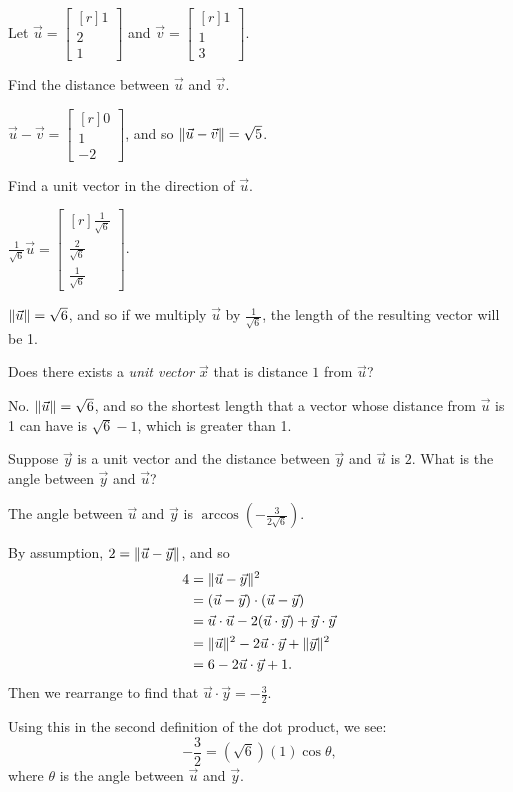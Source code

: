 \documentclass{problemset}
\newcommand{\mat}[1]{\begin{bmatrix*}[r]#1\end{bmatrix*}}
\DeclarePairedDelimiter\norm{\lVert}{\rVert}
\begin{document}
	\question
	Let $\vec u=\mat{1\\2\\1}$ and $\vec v=\mat{1\\1\\3}$.
	\begin{parts}
		\item Find the distance between $\vec u$ and $\vec v$.
			\begin{solution}
				$\vec u - \vec v = \mat{0\\1\\-2}$, and so $\norm{\vec u-\vec v} = \sqrt{5}$. 
			\end{solution}
		\item Find a unit vector in the direction of $\vec u$.
			\begin{solution}
				$\frac{1}{\sqrt{6}} \vec u = \mat{\frac{1}{\sqrt{6}}\\\frac{2}{\sqrt{6}}\\\frac{1}{\sqrt{6}}}$.

				$\norm{\vec u} = \sqrt{6}$, and so if we multiply $\vec u$ by $\frac{1}{\sqrt{6}}$,
				the length of the resulting vector will be 1. 
			\end{solution}
		\item Does there exists a \emph{unit vector} $\vec x$ that is distance
			$1$ from $\vec u$?
			\begin{solution}
				No. $\norm{\vec u} = \sqrt{6}$, and so the shortest length that a
				vector whose distance from $\vec u$ is 1 can have is $\sqrt{6} - 1$, 
				which is greater than 1. 
			\end{solution}
		\item Suppose $\vec y$ is a unit vector and the distance between $\vec y$ 
			and	$\vec u$ is $2$. What is the angle between $\vec y$ and $\vec u$?
			\begin{solution}
				The angle between $\vec u$ and $\vec y$ is $\arccos\left(-\frac{3}{2\sqrt{6}}\right)$. 

				By assumption, $2=\norm{\vec u-\vec y}$, and so
				\begin{align*}
					4 &= \norm{\vec u-\vec y}^2\\
					&= (\vec u-\vec y)\cdot(\vec u-\vec y)\\
					&= \vec u\cdot\vec u - 2(\vec u\cdot\vec y) + \vec y\cdot\vec y\\
					&=\norm{\vec u}^2 - 2\vec u\cdot\vec y + \norm{\vec y}^2\\
					&=6 - 2\vec u\cdot\vec y + 1.
				\end{align*}
				Then we rearrange to find that $\vec u\cdot \vec y = -\frac{3}{2}$.

				Using this in the second definition of the dot product, we see:
				\[
					-\frac{3}{2} = \left(\sqrt{6}\right)(1) \cos \theta,
				\]
				where $\theta$ is the angle between $\vec u$ and $\vec y$. 
			\end{solution}
	\end{parts}
\end{document}
